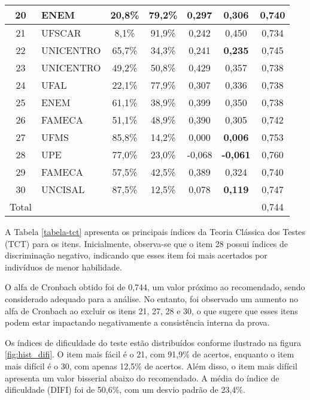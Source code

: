 \begin{table}[H]
{\begin{tabular*}{.8\textwidth}{@{\extracolsep{\fill}}clccccc@{}}
		\midrule 20 & ENEM & 20,8\% & 79,2\% & 0,297 & 0,306 & 0,740 \\ 
		\midrule 21 & UFSCAR & 8,1\% & 91,9\% & 0,242 & 0,450 & 0,734 \\ 
		\midrule 22 & UNICENTRO & 65,7\% & 34,3\% & 0,241 & \textbf{0,235} & 0,745 \\ 
		\midrule 23 & UNICENTRO & 49,2\% & 50,8\% & 0,429 & 0,357 & 0,738 \\ 
		\midrule 24 & UFAL & 22,1\% & 77,9\% & 0,307 & 0,336 & 0,738 \\ 
		\midrule 25 & ENEM & 61,1\% & 38,9\% & 0,399 & 0,350 & 0,738 \\ 
		\midrule 26 & FAMECA & 51,1\% & 48,9\% & 0,390 & 0,305 & 0,742 \\ 
		\midrule 27 & UFMS & 85,8\% & 14,2\% & 0,000 & \textbf{0,006} & 0,753 \\ 
		\midrule 28 & UPE & 77,0\% & 23,0\% & -0,068 & \textbf{-0,061} & 0,760 \\ 
		\midrule 29 & FAMECA & 57,5\% & 42,5\% & 0,389 & 0,324 & 0,740 \\ 
		\midrule 30 & UNCISAL & 87,5\% & 12,5\% & 0,078 & \textbf{0,119} & 0,747 \\
		\midrule  Total &&&&&& 0,744 \\
			\bottomrule
		\end{tabular*}
	}{%
	}
\end{table}


A Tabela \ref{tabela-tct} apresenta os principais índices da Teoria Clássica dos Testes (TCT) para os itens. Inicialmente, observa-se que o item 28 possui índices de discriminação negativo, indicando que esses item foi mais acertados por indivíduos de menor habilidade.


O alfa de Cronbach obtido foi de 0,744, um valor próximo ao recomendado, sendo considerado adequado para a análise. No entanto, foi observado um aumento no alfa de Cronbach ao excluir os itens 21, 27, 28 e 30, o que sugere que esses itens podem estar impactando negativamente a consistência interna da prova.


Os índices de dificuldade do teste estão distribuídos conforme ilustrado na figura \ref{fig:hist_difi}. O item mais fácil é o 21, com 91,9\% de acertos, enquanto o item mais difícil é o 30, com apenas 12,5\% de acertos. Além disso, o item mais difícil apresenta um valor bisserial abaixo do recomendado. A média do índice de dificuldade (DIFI) foi de 50,6\%, com um desvio padrão de 23,4\%.

